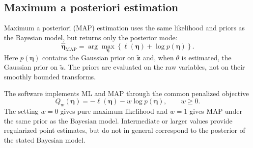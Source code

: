 \subsection{Maximum a posteriori estimation}

Maximum a posteriori (MAP) estimation uses the same likelihood and priors as the
Bayesian model, but returns only the posterior mode:
\[
\widehat{\bm\eta}_{\mathrm{MAP}}
=
\arg\max_{\bm\eta}
\left\{
\ell(\bm\eta)+\log p(\bm\eta)
\right\}.
\]
Here $p(\bm\eta)$ contains the Gaussian prior on $\widetilde{\bm z}$ and,
when $\theta$ is estimated, the Gaussian prior on $\widetilde u$. The priors
are evaluated on the raw variables, not on their smoothly bounded transforms.

The software implements ML and MAP through the common penalized objective
\[
Q_w(\bm\eta)
=
-\ell(\bm\eta)-w\log p(\bm\eta),
\qquad w\ge 0.
\]
The setting $w=0$ gives pure maximum likelihood and $w=1$ gives MAP under the
same prior as the Bayesian model. Intermediate or larger values provide regularized
point estimates, but do not in general correspond to the posterior of the stated
Bayesian model.

